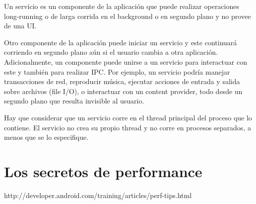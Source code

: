 Un servicio es un componente de la aplicaci\'on que puede realizar operaciones long-running o de larga corrida en el background o en segundo plano y no provee de una \ac{UI}.

Otro componente de la aplicaci\'on puede iniciar un servicio y este continuar\'a corriendo en segundo plano a\'un si el usuario cambia a otra aplicaci\'on. Adicionalmente, un componente puede unirse a un servicio para interactuar con este y tambi\'en para realizar \ac{IPC}. Por ejemplo, un servicio podr\'ia manejar transacciones de red, reproducir m\'usica, ejecutar acciones de entrada y salida sobre archivos (file I/O), o interactuar con un content provider, todo desde un segundo plano que resulta invisible al usuario.

Hay que considerar que un servicio corre en el thread principal del proceso que lo contiene. El servicio no crea su propio thread y no corre en procesos separados, a menos que se lo especifique.

\section{Los secretos de performance}
\label{sec:performance.secrets}

http://developer.android.com/training/articles/perf-tips.html

